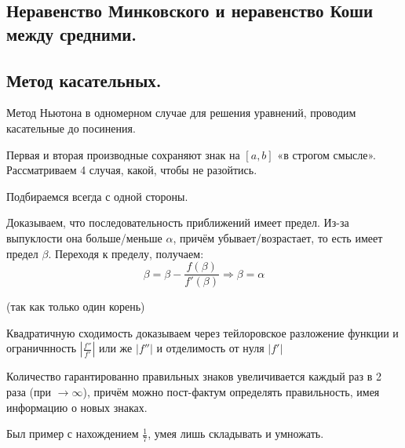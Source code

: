\documentclass[12pt, a4paper]{article}
\begin{document}
\subsection{Неравенство Минковского и неравенство Коши между средними.}



\subsection{Метод касательных.}

Метод Ньютона в одномерном случае для решения уравнений, проводим касательные до посинения.

Первая и вторая производные сохраняют знак на $[a, b]$ «в строгом смысле».
Рассматриваем 4 случая, какой, чтобы не разойтись.

Подбираемся всегда с одной стороны.

Доказываем, что последовательность приближений имеет предел. Из-за выпуклости она больше/меньше $\alpha$, 
причём убывает/возрастает, то есть имеет предел $\beta$. Переходя к пределу, получаем:
\begin{equation*}
    \beta = \beta - \frac{f(\beta)}{f'(\beta)} \Longrightarrow \beta = \alpha
\end{equation*}

(так как только один корень)

Квадратичную сходимость доказываем через тейлоровское разложение функции 
и ограничнность $\left| \frac{f''}{f'} \right|$ или же $\left| f'' \right|$ и отделимость от нуля $\left| f' \right|$

Количество гарантированно правильных знаков увеличивается каждый раз в 2 раза (при $\rightarrow \infty$), причём можно пост-фактум определять правильность, имея информацию о новых знаках.

Был пример с нахождением $\frac{1}{7}$, умея лишь складывать и умножать.
\end{document}
